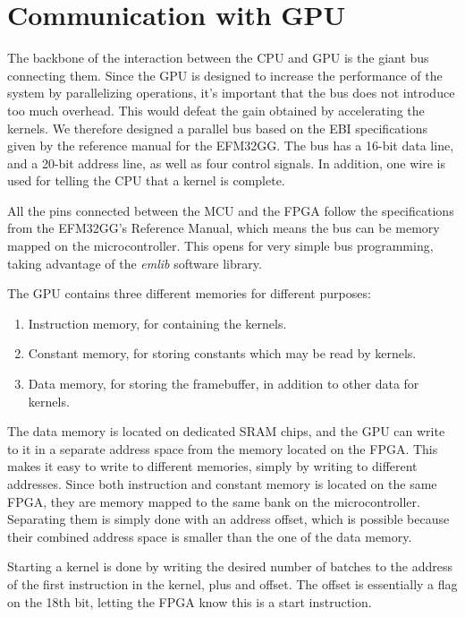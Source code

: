 \documentclass[../main/report.tex]{subfiles}
\begin{document}
\section{Communication with GPU}

The backbone of the interaction between the CPU and GPU is the giant bus connecting them.
Since the GPU is designed to increase the performance of the system by parallelizing operations,
it's important that the bus does not introduce too much overhead.
This would defeat the gain obtained by accelerating the kernels.
We therefore designed a parallel bus based on the EBI specifications given
by the reference manual for the EFM32GG.
The bus has a 16-bit data line, and a 20-bit address line, as well as four control signals.
In addition, one wire is used for telling the CPU that a kernel is complete.

All the pins connected between the MCU and the FPGA follow the specifications from the EFM32GG's Reference Manual\cite[p.175]{efm32gg},
which means the bus can be memory mapped on the microcontroller.
This opens for very simple bus programming, taking advantage of the \textit{emlib} software library.

The GPU contains three different memories for different purposes:

\begin{enumerate}
    \item Instruction memory, for containing the kernels.
    \item Constant memory, for storing constants which may be read by kernels.
    \item Data memory, for storing the framebuffer, in addition to other data for kernels.
\end{enumerate}

The data memory is located on dedicated SRAM chips,
and the GPU can write to it in a separate address space from the memory located on the FPGA.
This makes it easy to write to different memories, simply by writing to different addresses.
Since both instruction and constant memory is located on the same FPGA,
they are memory mapped to the same bank on the microcontroller.
Separating them is simply done with an address offset,
which is possible because their combined address space is smaller than the one of the data memory.

Starting a kernel is done by writing the desired number of batches
 to the address of the first instruction in the kernel, plus and offset.
The offset is essentially a flag on the 18th bit, letting the FPGA know this is a start instruction.
\end{document}
